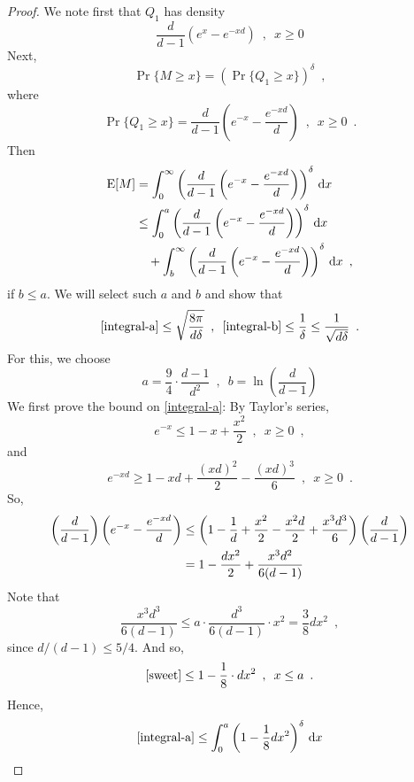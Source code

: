 \documentclass[lotsofwhite]{patmorin}
\begin{document}
\begin{proof}
   We note first that $Q_1$ has density
   \[
        \frac{d}{d-1}\left(e^x - e^{-xd}\right) \enspace , \enspace x\ge 0
   \]
   Next,
   \[
        \Pr\{M \ge x\} = \left(\Pr\{Q_1\ge x\}\right)^{\delta} \enspace ,
   \]
   where 
   \[
        \Pr\{Q_1\ge x\} = \frac{d}{d-1}\left(e^{-x}-\frac{e^{-xd}}{d}\right) \enspace ,\enspace x\ge 0 \enspace .
   \]
   Then
   \begin{align}
       \E[M] 
        & = \int_0^\infty \left(\frac{d}{d-1}\left(e^{-x}-\frac{e^{-xd}}{d}\right)\right)^\delta \,\mathrm{d}x \notag \\ 
        & \le
          \int_0^a \left(\frac{d}{d-1}\left(e^{-x}-\frac{e^{-xd}}{d}\right)\right)^\delta \,\mathrm{d}x  \eqlabel{integral-a} \\
          & \quad + \int_b^\infty \left(\frac{d}{d-1}\left(e^{-x}-\frac{e^{-xd}}{d}\right)\right)^\delta \,\mathrm{d}x \enspace , \eqlabel{integral-b}
   \end{align}
   if $b\le a$.  We will select such $a$ and $b$ and show that 
   \[  \eqref{integral-a} \le \sqrt{\frac{8\pi}{d\delta}} \enspace , \enspace
       \eqref{integral-b} \le \frac{1}{\delta} \le \frac{1}{\sqrt{d\delta}} \enspace .
   \]
   For this, we choose 
   \[
        a = \frac{9}{4}\cdot\frac{d-1}{d^2} \enspace, \enspace b=\ln\left(\frac{d}{d-1}\right)
   \]
   We first prove the bound on \eqref{integral-a}:  By Taylor's series, 
   \[   e^{-x} \le 1 - x + \frac{x^2}{2} \enspace , \enspace x\ge 0 \enspace , \]
   and
   \[   e^{-xd} \ge 1 - xd + \frac{(xd)^2}{2} - \frac{(xd)^3}{6}\enspace , \enspace x\ge 0 \enspace . \]
   So,
   \begin{align}
       \left(\frac{d}{d-1}\right)\left(e^{-x}-\frac{e^{-xd}}{d}\right)
       & \le 
       \left(
         1-\frac{1}{d}+\frac{x^2}{2}-\frac{x^2d}{2}+\frac{x^3d^3}{6}
       \right) \left(\frac{d}{d-1}\right) \notag \\
       & = 1-\frac{dx^2}{2}+\frac{x^3d^2}{6(d-1)}  \eqlabel{sweet}
   \end{align}
   Note that
   \[
         \frac{x^3d^3}{6(d-1)} \le a\cdot \frac{d^3}{6(d-1)}\cdot x^2
      = \frac{3}{8}dx^2 
      \enspace ,
   \] 
   since $d/(d-1) \le 5/4$. And so,
   \[
      \eqref{sweet} \le 1-\frac{1}{8}\cdot dx^2 \enspace , \enspace x \le a \enspace .
   \]
   Hence,
   \begin{align*}
      \eqref{integral-a} 
        & \le \int_0^a\left(1-\frac{1}{8}dx^2\right)^\delta \, \mathrm{d}x \\

\end{align*}
\end{proof}
\end{document}
